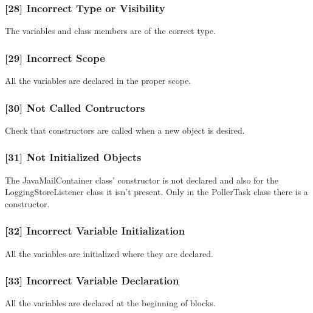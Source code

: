 \subsubsection{[28] Incorrect Type or Visibility}
The variables and class members are of the correct type. 

\subsubsection{[29] Incorrect Scope}
All the variables are declared in the proper scope.

\subsubsection{[30] Not Called Contructors}
Check that constructors are called when a new object is desired.

\subsubsection{[31] Not Initialized Objects}
The JavaMailContainer class' constructor is not declared and  also for the LoggingStoreListener class it isn't present. Only in the PollerTask class there is a constructor.

\subsubsection{[32] Incorrect Variable Initialization}
All the variables are initialized where they are declared.

\subsubsection{[33] Incorrect Variable Declaration}
All the variables are declared at the beginning of blocks.
